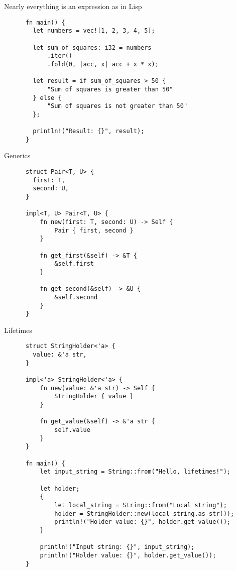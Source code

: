 \documentclass{beamer}
\begin{document}
\begin{frame}[fragile]{Nearly everything is an expression as in Lisp}
  \begin{listing}
    \begin{verbatim}
      fn main() {
        let numbers = vec![1, 2, 3, 4, 5];
    
        let sum_of_squares: i32 = numbers
            .iter()
            .fold(0, |acc, x| acc + x * x);
    
        let result = if sum_of_squares > 50 {
            "Sum of squares is greater than 50"
        } else {
            "Sum of squares is not greater than 50"
        };
    
        println!("Result: {}", result);
      }
    \end{verbatim}
  \end{listing}
\end{frame}

\begin{frame}[fragile]{Generics}
  \begin{listing}
    \begin{verbatim}
      struct Pair<T, U> {
        first: T,
        second: U,
      }
    
      impl<T, U> Pair<T, U> {
          fn new(first: T, second: U) -> Self {
              Pair { first, second }
          }
      
          fn get_first(&self) -> &T {
              &self.first
          }
      
          fn get_second(&self) -> &U {
              &self.second
          }
      }
    \end{verbatim}
  \end{listing}
\end{frame}

\begin{frame}[fragile]{Lifetimes}
  \begin{listing}
    \begin{verbatim}
      struct StringHolder<'a> {
        value: &'a str,
      }
      
      impl<'a> StringHolder<'a> {
          fn new(value: &'a str) -> Self {
              StringHolder { value }
          }
      
          fn get_value(&self) -> &'a str {
              self.value
          }
      }
      
      fn main() {
          let input_string = String::from("Hello, lifetimes!");
      
          let holder;
          {
              let local_string = String::from("Local string");
              holder = StringHolder::new(local_string.as_str());
              println!("Holder value: {}", holder.get_value());
          }
      
          println!("Input string: {}", input_string);
          println!("Holder value: {}", holder.get_value());
      }
    \end{verbatim}
  \end{listing}
\end{frame}
\end{document}
